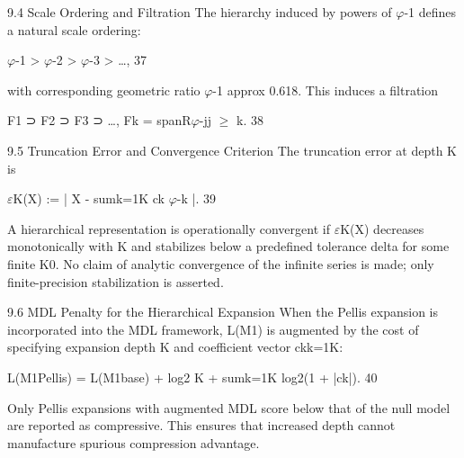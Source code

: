   9.4 Scale Ordering and Filtration
  The hierarchy induced by powers of $\varphi$-1 defines a natural scale ordering:

  $\varphi$-1 > $\varphi$-2 > $\varphi$-3 > …, 37

  with corresponding geometric ratio $\varphi$-1 approx 0.618. This induces a filtration

  F1 ⊃ F2 ⊃ F3 ⊃ …, Fk = spanR{$\varphi$-j}j $\geq$ k. 38

  9.5 Truncation Error and Convergence Criterion
  The truncation error at depth K is

  $\varepsilon$K(X) := | X - sumk=1K ck $\varphi$-k |. 39

  A hierarchical representation is operationally convergent if $\varepsilon$K(X) decreases
  monotonically with K and stabilizes below a predefined tolerance delta for some finite
  K0. No claim of analytic convergence of the infinite series is made; only finite-precision
  stabilization is asserted.

  9.6 MDL Penalty for the Hierarchical Expansion
  When the Pellis expansion is incorporated into the MDL framework, L(M1) is
  augmented by the cost of specifying expansion depth K and coefficient vector
  {ck}k=1K:

  L(M1Pellis) = L(M1base) + log2 K + sumk=1K log2(1 + |ck|). 40

  Only Pellis expansions with augmented MDL score below that of the null model are
  reported as compressive. This ensures that increased depth cannot manufacture
  spurious compression advantage.

